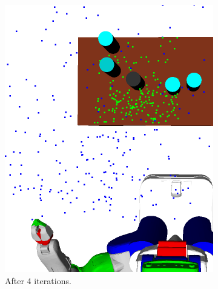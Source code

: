 \begin{figure}[t]
\begin{subfigure}[b]{0.4\linewidth}
    \includegraphics[width=\textwidth]{images/learn4.png}
    \caption{After 4 iterations.}
  \end{subfigure}
  \begin{subfigure}[b]{0.35\linewidth}

\end{subfigure}
\end{figure}
